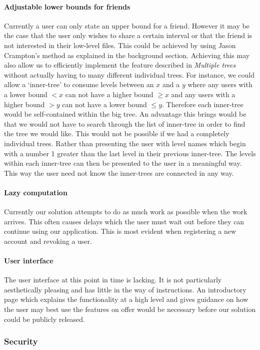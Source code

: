 \documentclass[12pt, titlepage]{article}
\begin{document}
\paragraph*{Adjustable lower bounds for friends} Currently a user can only state an upper bound for a friend. However it may be the case that the user only wishes to share a certain interval or that the friend is not interested in their low-level files. This could be achieved by using Jason Crampton's method as explained in the background section. Achieving this may also allow us to efficiently implement the feature described in \textit{Multiple trees} without actually having to many different individual trees. For instance, we could allow a `inner-tree' to consume levels between an $x$ and a $y$ where any users with a lower bound $< x$ can not have a higher bound $\geq x$ and any users with a higher bound $> y$ can not have a lower bound $\leq y$. Therefore each inner-tree would be self-contained within the big tree. An advantage this brings would be that we would not have to search through the list of inner-tree in order to find the tree we would like. This would not be possible if we had a completely individual trees.
\newline \indent Rather than presenting the user with level names which begin with a number 1 greater than the last level in their previous inner-tree. The levels within each inner-tree can then be presented to the user in a meaningful way. This way the user need not know the inner-trees are connected in any way.
\paragraph*{Lazy computation} Currently our solution attempts to do as much work as possible when the work arrives. This often causes delays which the user must wait out before they can continue using our application. This is most evident when registering a new account and revoking a user.
\paragraph*{User interface} The user interface at this point in time is lacking. It is not particularly aesthetically pleasing and has little in the way of instructions. An introductory page which explains the functionality at a high level and gives guidance on how the user may best use the features on offer would be necessary before our solution could be publicly released.

\subsubsection*{Security}
\end{document}
